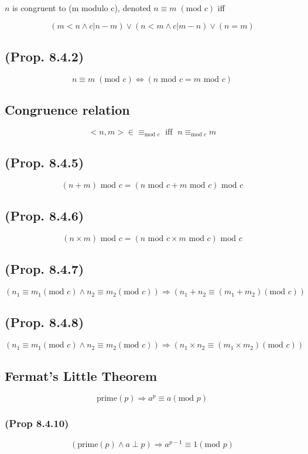 \documentclass[12pt]{article}
\begin{document}
\begin{spacing}{1.5}
$n$ is congruent to (m modulo c), denoted $n \equiv m \;  (\text{mod } c)$ iff

$$(m < n \wedge c | n-m) \vee (n < m \wedge c | m - n) \vee (n = m)$$

\subsection{(Prop. 8.4.2)}

$$n \equiv m \; (\text{mod } c) \Leftrightarrow (n \text{ mod } c = m \text{ mod } c)$$

\subsection{Congruence relation}

$$< n, m > \in \equiv_{\text{mod } c} \text{ iff } \; n \equiv_{\text{mod } c} m$$

\subsection{(Prop. 8.4.5)}

$$(n+m) \text{ mod } c = (n \text{ mod } c + m \text{ mod } c) \text{ mod } c$$

\subsection{(Prop. 8.4.6)}

$$(n \times m) \text{ mod } c = (n \text{ mod } c \times m \text{ mod } c) \text{ mod } c$$

\subsection{(Prop. 8.4.7)}

$$(n_1 \equiv m_1 (\text{mod } c) \wedge 
n_2 \equiv m_2 (\text{mod } c)) \Rightarrow
( n_1 + n_2 \equiv (m_1 + m_2) (\text{mod } c) )$$


\subsection{(Prop. 8.4.8)}

$$(n_1 \equiv m_1 (\text{mod } c) \wedge 
n_2 \equiv m_2 (\text{mod } c)) \Rightarrow
( n_1 \times n_2 \equiv (m_1 \times m_2) (\text{mod } c) )$$


\subsection{Fermat's Little Theorem}

$$\text{prime}(p) \Rightarrow a^p \equiv a (\text{mod } p)$$

\subsubsection{(Prop 8.4.10)}

$$(\text{prime}(p) \wedge a \perp p) \Rightarrow a^{p-1} \equiv 1 (\text{mod } p)$$

\end{spacing}
\end{document}
